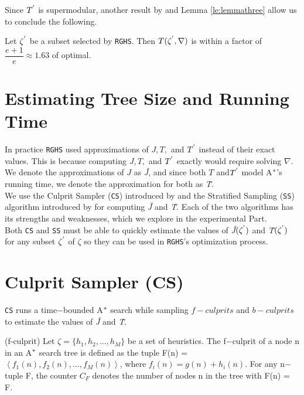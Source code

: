Since $T\sp{'}$ is supermodular, another result by \cite{buchbinder2014submodular} and Lemma \ref{le:lemmathree} allow us to conclude the following.


\begin{theorem}
Let $\zeta\sp{'}$ be a subset selected by \texttt{RGHS}. Then $T(\zeta\sp{'}, \nabla)$ is within a factor of $\dfrac{e+1}{e} \approx 1.63$ of optimal.
\label{th:theorem_three}
\end{theorem}

\section{Estimating Tree Size and Running Time}
In  practice \texttt{RGHS} used approximations of $J,T,$ and $T\sp{'}$ instead of their exact values. This is because computing $J,T,$ and $T\sp{'}$ exactly would require solving $\nabla$. We denote the approximations of $J$ as \textit{\^{J}}, and since both $T$ and$T\sp{'}$ model A$\sp{*}$'s running time, we denote the approximation for both as \textit{\^{T}}.\\

We use the Culprit Sampler (\texttt{CS}) introduced by \cite{BarleySantiagoOver} and the Stratified Sampling (\texttt{SS}) algorithm introduced by \cite{chen1992heuristic} for computing \textit{\^{J}} and \textit{\^{T}}. Each of the two algorithms has its strengths and weaknesses, which we explore in the experimental Part.\\

Both \texttt{CS} and \texttt{SS} must be able to quickly estimate the values of \textit{\^{J}}$(\zeta\sp{'})$ and \textit{\^{T}}$(\zeta\sp{'})$ for any subset $\zeta\sp{'}$ of $\zeta$ so they can be used in \texttt{RGHS}'s optimization process.

\section{Culprit Sampler (CS)}
\noindent
\texttt{CS} runs a time$-$bounded A$\sp{*}$ search while sampling $f-culprits$ and $b-culprits$ to estimate the values of \textit{\^{J}} and \textit{\^{T}}.

\begin{definition}(f-culprit)
Let $\zeta = \{h_{1}, h_{2},...,h_{M}\}$ be a set of heuristics. The f$-$culprit of a node n in an A$\sp{*}$ search tree is defined as the tuple F(n) = $\left\langle f_{1}(n), f_{2}(n),...,f_{M}(n)  \right\rangle$, where $f_{i}(n) = g(n)+h_{i}(n)$. For any n$-$tuple F, the counter $C_{F}$ denotes the number of nodes n in the tree with F(n) = F.
\label{def:def_fculprits}
\end{definition}

